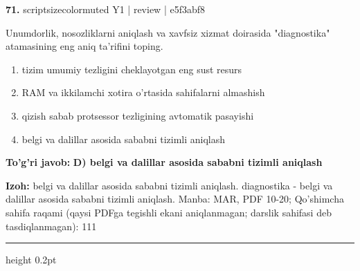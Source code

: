 \documentclass[10pt,a4paper]{article}
\begin{document}
{\bfseries\sffamily\color{ink} 71.} {scriptsizecolor{muted} Y1 | review | e5f3abf8}
\par
Unumdorlik, nosozliklarni aniqlash va xavfsiz xizmat doirasida "diagnostika" atamasining eng aniq ta'rifini toping.
\begin{enumerate}[label=\Alph*),leftmargin=9mm]
\item tizim umumiy tezligini cheklayotgan eng sust resurs
\item RAM va ikkilamchi xotira o'rtasida sahifalarni almashish
\item qizish sabab protsessor tezligining avtomatik pasayishi
\item belgi va dalillar asosida sababni tizimli aniqlash
\end{enumerate}
\begin{tcolorbox}[enhanced,breakable,colback=teal!4,colframe=teal!60!black,boxrule=0.45pt,arc=1.2mm,left=2.7mm,right=2.7mm,top=1.8mm,bottom=1.8mm,before skip=2mm,after skip=2mm]
{\bfseries\sffamily\color{teal}To'g'ri javob:} \textbf{D) belgi va dalillar asosida sababni tizimli aniqlash}
\par\smallskip
{\bfseries Izoh:} belgi va dalillar asosida sababni tizimli aniqlash. diagnostika - belgi va dalillar asosida sababni tizimli aniqlash. Manba: MAR, PDF 10-20; Qo'shimcha sahifa raqami (qaysi PDFga tegishli ekani aniqlanmagan; darslik sahifasi deb tasdiqlanmagan): 111
\end{tcolorbox}
\vspace{2mm}\hrule height 0.2pt\vspace{3mm}
\end{document}
